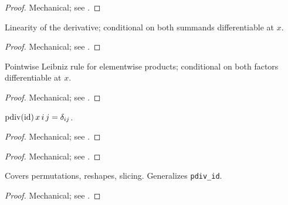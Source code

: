 \begin{proof}
\leanok
Mechanical; see .
\end{proof}

\begin{theorem}
  \label{ax:pdiv_add}
  \leanok
  Linearity of the derivative; conditional on both summands differentiable at \(x\).
\end{theorem}

\begin{proof}
\leanok
Mechanical; see .
\end{proof}

\begin{theorem}
  \label{ax:pdiv_mul}
  \leanok
  Pointwise Leibniz rule for elementwise products; conditional on both factors
  differentiable at \(x\).
\end{theorem}

\begin{proof}
\leanok
Mechanical; see .
\end{proof}

\begin{theorem}
  \label{ax:pdiv_id}
  \leanok
  \(\operatorname{pdiv}(\mathrm{id})\, x\, i\, j = \delta_{ij}\).
\end{theorem}

\begin{proof}
\leanok
Mechanical; see .
\end{proof}

\begin{theorem}
  \label{ax:pdiv_const}
  \leanok
\end{theorem}

\begin{proof}
\leanok
Mechanical; see .
\end{proof}

\begin{theorem}
  \label{ax:pdiv_reindex}
  \leanok
  Covers permutations, reshapes, slicing. Generalizes \texttt{pdiv\_id}.
\end{theorem}

\begin{proof}
\leanok
Mechanical; see .
\end{proof}

